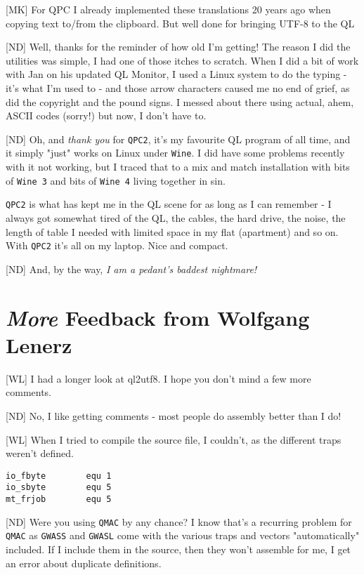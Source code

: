 [MK] For QPC I already implemented these translations 20 years ago when
copying text to/from the clipboard. But well done for bringing UTF-8
to the QL 

[ND] Well, thanks for the reminder of how old I'm getting! The reason I did the utilities was simple, I had one of those itches to scratch. When I did a bit of work with Jan on his updated QL Monitor, I used a Linux system to do the typing - it's what I'm used to - and those arrow characters caused me no end of grief, as did the copyright and the pound signs. I messed about there using actual, ahem, ASCII codes (sorry!) but now, I don't have to.

[ND] Oh, and \emph{thank you} for  \texttt{QPC2}, it's my favourite QL program of all time, and it simply "just" works on Linux under  \texttt{Wine}. I did have some problems recently with it not working, but I traced that to a mix and match installation with bits of  \texttt{Wine 3} and bits of  \texttt{Wine 4} living together in sin. 

\texttt{QPC2} is what has kept me in the QL scene for as long as I can remember - I always got somewhat tired of the QL, the cables, the hard drive, the noise, the length of table I needed with limited space in my flat (apartment) and so on. With  \texttt{QPC2} it's all on my laptop. Nice and compact.

[ND] And, by the way, \emph{I am a pedant's baddest nightmare!}


\section{\emph{More} Feedback from Wolfgang Lenerz}


[WL] I had a longer look at ql2utf8. I hope you don't mind a few more comments.

[ND] No, I like getting comments - most people do assembly better than I do!

[WL] When I tried to compile the source file, I couldn't, as the different traps weren't defined.

\begin{lstlisting}[numbers=none]
io_fbyte        equ 1
io_sbyte        equ 5
mt_frjob        equ 5
\end{lstlisting}

[ND] Were you using \texttt{QMAC} by any chance? I know that's a recurring problem for \texttt{QMAC} as \texttt{GWASS} and \texttt{GWASL} come with the various traps and vectors "automatically" included. If I include them in the source, then they won't assemble for me, I get an error about duplicate definitions.


